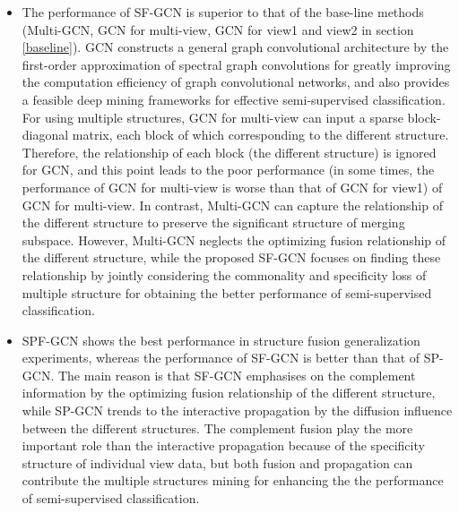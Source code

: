 \documentclass[review]{elsarticle}
\begin{document}
\begin{itemize}
\item  The performance of SF-GCN is superior to that of the base-line methods (Multi-GCN\cite{khan2019multi}, GCN \cite{kipf2016semi} for multi-view, GCN \cite{kipf2016semi} for view1 and view2 in section \ref{baseline}). GCN \cite{kipf2016semi} constructs a general graph convolutional architecture by the first-order approximation of spectral graph convolutions for greatly improving the computation efficiency of graph convolutional networks, and also provides a feasible deep mining frameworks for effective semi-supervised classification. For using multiple structures, GCN for multi-view can input a sparse block-diagonal matrix, each block of which corresponding to the different structure. Therefore, the relationship of each block (the different structure) is ignored for GCN, and this point leads to the poor performance (in some times, the performance of GCN for multi-view is worse than that of GCN for view1) of GCN for multi-view. In contrast, Multi-GCN\cite{khan2019multi} can capture the relationship of the different structure to preserve the significant structure of merging subspace. However, Multi-GCN\cite{khan2019multi} neglects the optimizing fusion relationship of the different structure, while the proposed SF-GCN focuses on finding these relationship by jointly considering the commonality and specificity loss of multiple structure for obtaining the better performance of semi-supervised classification.
\item SPF-GCN shows the best performance in structure fusion generalization experiments, whereas the performance of SF-GCN is better than that of SP-GCN. The main reason is that SF-GCN emphasises on the complement information by the optimizing fusion relationship of the different structure, while SP-GCN trends to the interactive propagation by the diffusion influence between the different structures. The complement fusion play the more important role than the interactive propagation because of the specificity structure of individual view data, but both fusion and propagation can contribute the multiple structures mining for enhancing the the performance of semi-supervised classification.

\end{itemize}
\end{document}
